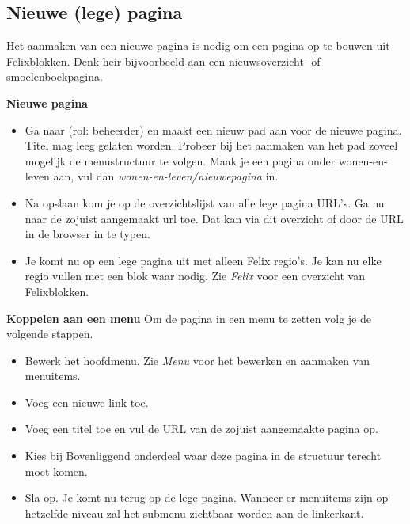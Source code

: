 \subsection{Nieuwe (lege) pagina}\label{nieuwepagina}
Het aanmaken van een nieuwe pagina is nodig om een pagina op te bouwen uit Felixblokken. Denk heir bijvoorbeeld aan een nieuwsoverzicht- of smoelenboekpagina.

\textbf{Nieuwe pagina}

\begin{itemize}
\item Ga naar  (rol: beheerder) en maakt een nieuw pad aan voor de nieuwe pagina. Titel mag leeg gelaten worden. Probeer bij het aanmaken van het pad zoveel mogelijk de menustructuur te volgen. Maak je een pagina onder wonen-en-leven aan, vul dan \emph{wonen-en-leven/nieuwepagina} in.
\item Na opslaan kom je op de overzichtslijst van alle lege pagina URL's. Ga nu naar de zojuist aangemaakt url toe. Dat kan via dit overzicht of door de URL in de browser in te typen.
\item Je komt nu op een lege pagina uit met alleen Felix regio's. Je kan nu elke regio vullen met een blok waar nodig. Zie \emph{Felix} voor een overzicht van Felixblokken.
\end{itemize}

\textbf{Koppelen aan een menu}
Om de pagina in een menu te zetten volg je de volgende stappen.

\begin{itemize}
\item Bewerk het hoofdmenu. Zie \emph{Menu} voor het bewerken en aanmaken van menuitems.
\item Voeg een nieuwe link toe.
\item Voeg een titel toe en vul de URL van de zojuist aangemaakte pagina op.
\item Kies bij Bovenliggend onderdeel waar deze pagina in de structuur terecht moet komen.
\item Sla op. Je komt nu terug op de lege pagina. Wanneer er menuitems zijn op hetzelfde niveau zal het submenu zichtbaar worden aan de linkerkant.
\end{itemize}